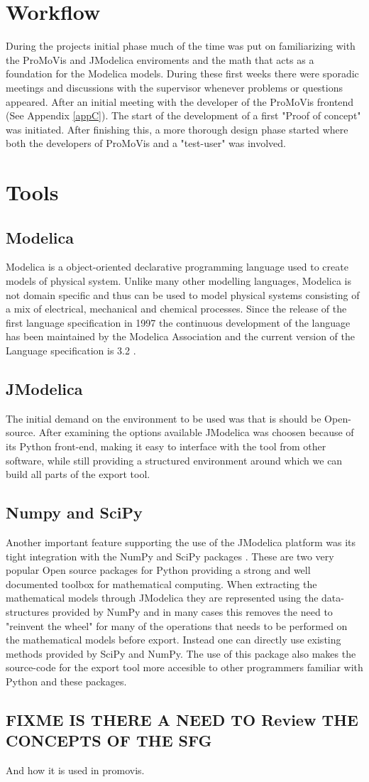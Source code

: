 \section{Workflow}
During the projects initial phase much of the time was put on familiarizing with the ProMoVis and JModelica enviroments and the math that acts as a foundation for the Modelica models. During these first weeks there were sporadic meetings and discussions with the supervisor whenever problems or questions appeared. After an initial meeting with the developer of the ProMoVis frontend (See Appendix \ref{appC}). The start of the development of a first "Proof of concept" was initiated. After finishing this, a more thorough design phase started where both the developers of ProMoVis and a "test-user" was involved. 
\section{Tools}
\subsection{Modelica}
Modelica is a object-oriented declarative programming language used to create models of physical system. Unlike many other modelling languages, Modelica is not domain specific and thus can be used to model physical systems consisting of a mix of electrical, mechanical and chemical processes. Since the release of the first language specification in 1997 the continuous development of the language has been maintained by the Modelica Association and the current version of the Language specification is 3.2 \cite{ModelicaSpec}.\nocite{*}
\subsection{JModelica}
The initial demand on the environment to be used was that is should be Open-source. After examining the options available JModelica\cite{jmodelicaorg}\nocite{*} was choosen because of its Python front-end, making it easy to interface with the tool from other software, while still providing a structured environment around which we can build all parts of the export tool.   
\subsection{Numpy and SciPy}
Another important feature supporting the use of the JModelica platform was its tight integration with the NumPy and SciPy packages \cite{scipyorg}\nocite{*}. These are two very popular Open source packages for Python providing a strong and well documented toolbox for mathematical computing. When extracting the mathematical models through JModelica they are represented using the data-structures provided by NumPy and in many cases this removes the need to "reinvent the wheel" for many of the operations that needs to be performed on the mathematical models before export. Instead one can directly use existing methods provided by SciPy and NumPy. The use of this package also makes the source-code for the export tool more accesible to other programmers familiar with Python and these packages.
\subsection{FIXME IS THERE A NEED TO Review THE CONCEPTS OF THE SFG }
And how it is used in promovis.
